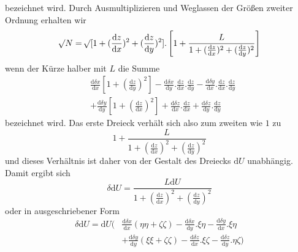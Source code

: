bezeichnet wird. Durch Ausmultiplizieren und Weglassen der Größen zweiter Ordnung erhalten wir
\[
\mathord{{}^{}\!\surd}N=\mathord{{}^{}\!\surd}[1+(\frac{\mathrm{d}z}{\mathrm{d}x})^2+(\frac{\mathrm{d}z}{\mathrm{d}y})^2].\left[1+\frac{L}{1+(\frac{\mathrm{d}z}{\mathrm{d}x})^2+(\frac{\mathrm{d}z}{\mathrm{d}y})^2}\right]
\]
wenn der Kürze halber mit $L$ die Summe
\[
\begin{aligned}
&\frac{\mathrm{d}\delta x}{\mathrm{d}x}[1+(\frac{\mathrm{d}z}{\mathrm{d}y})^2]-\frac{\mathrm{d}\delta x}{\mathrm{d}y}.\frac{\mathrm{d}z}{\mathrm{d}x}.\frac{\mathrm{d}z}{\mathrm{d}y}-\frac{\mathrm{d}\delta y}{\mathrm{d}x}.\frac{\mathrm{d}z}{\mathrm{d}x}.\frac{\mathrm{d}z}{\mathrm{d}y}\\
&+\frac{\mathrm{d}\delta y}{\mathrm{d}y}[1+(\frac{\mathrm{d}z}{\mathrm{d}x})^2]+\frac{\mathrm{d}\delta z}{\mathrm{d}x}.\frac{\mathrm{d}z}{\mathrm{d}x}+\frac{\mathrm{d}\delta z}{\mathrm{d}y}.\frac{\mathrm{d}z}{\mathrm{d}y}
\end{aligned}
\]
bezeichnet wird. Das erste Dreieck verhält sich also zum zweiten wie $1$ zu
\[
1+\frac{L}{1+(\frac{\mathrm{d}z}{\mathrm{d}x})^2+(\frac{\mathrm{d}z}{\mathrm{d}y})^2}
\]
und dieses Verhältnis ist daher von der Gestalt des Dreiecks $\mathrm{d}U$ unabhängig. Damit ergibt sich
\[
\delta\mathrm{d}U=\frac{L\mathrm{d}U}{1+(\frac{\mathrm{d}z}{\mathrm{d}x})^2+(\frac{\mathrm{d}z}{\mathrm{d}y})^2}
\]
oder in ausgeschriebener Form
\[
\begin{aligned}
\delta\mathrm{d}U=\mathrm{d}U\big(&\frac{\mathrm{d}\delta x}{\mathrm{d}x}(\eta\eta+\zeta\zeta)-\frac{\mathrm{d}\delta x}{\mathrm{d}y}.\xi\eta-\frac{\mathrm{d}\delta y}{\mathrm{d}x}.\xi\eta\\
&+\frac{\mathrm{d}\delta y}{\mathrm{d}y}(\xi\xi+\zeta\zeta)-\frac{\mathrm{d}\delta z}{\mathrm{d}x}.\xi\zeta-\frac{\mathrm{d}\delta z}{\mathrm{d}y}.\eta\zeta\big)
\end{aligned}
\]

